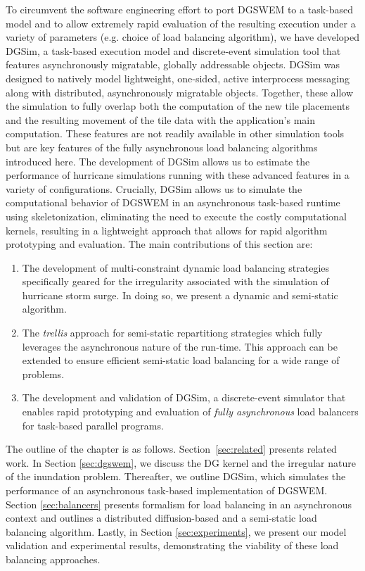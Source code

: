 To circumvent the software engineering effort to port DGSWEM to a task-based model and to allow extremely rapid evaluation of the resulting execution under a variety of parameters (e.g. choice of load balancing algorithm), we have developed DGSim, a task-based execution model and discrete-event simulation tool that features asynchronously migratable, globally addressable objects.
DGSim was designed to natively model lightweight, one-sided, active interprocess messaging along with distributed, asynchronously migratable objects.  Together, these allow the simulation to fully overlap both the computation of the new tile placements and the resulting movement of the tile data with the application's main computation.  These features are not readily available in other simulation tools but are key features of the fully asynchronous load balancing algorithms introduced here.
The development of DGSim allows us to estimate the performance of hurricane simulations running with these advanced features in a variety of configurations.
Crucially, DGSim allows us to simulate the computational behavior of DGSWEM in an asynchronous task-based runtime using skeletonization, eliminating the need to execute the costly computational kernels, resulting in a lightweight approach that allows for rapid algorithm prototyping and evaluation.
The main contributions of this section are:
\begin{enumerate}
\item The development of multi-constraint dynamic load balancing strategies specifically geared for the irregularity associated with the simulation of hurricane storm surge. In doing so, we present a dynamic and semi-static algorithm.
\item The \emph{trellis} approach for semi-static repartitiong strategies which fully leverages the asynchronous nature of the run-time. This approach can be extended to ensure efficient semi-static load balancing for a wide range of problems.
\item The development and validation of DGSim, a discrete-event simulator that enables rapid prototyping and evaluation of {\em fully asynchronous} load balancers for task-based parallel programs.
\end{enumerate}

The outline of the chapter is as follows. Section~\ref{sec:related} presents related work.  In Section \ref{sec:dgswem}, we discuss the DG kernel and the irregular nature of the inundation problem. Thereafter, we outline DGSim, which simulates the performance of an asynchronous task-based implementation of DGSWEM. Section \ref{sec:balancers} presents formalism for load balancing in an asynchronous context and outlines a distributed diffusion-based and a semi-static load balancing algorithm. Lastly, in Section \ref{sec:experiments}, we present our model validation and experimental results, demonstrating the viability of these load balancing approaches.
